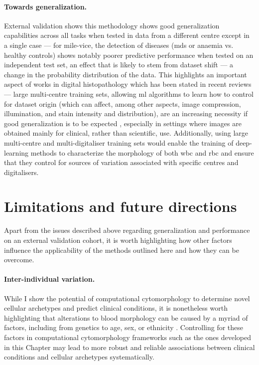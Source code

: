 \paragraph{Towards generalization.} External validation shows this methodology shows good generalization capabilities across all tasks when tested in data from a different centre except in a single case --- for \ac{mile-vice}, the detection of diseases (\ac{mds} or anaemia vs. healthy controls) shows notably poorer predictive performance when tested on an independent test set, an effect that is likely to stem from dataset shift --- a change in the probability distribution of the data. This highlights an important aspect of works in digital histopathology which has been stated in recent reviews --- large multi-centre training sets, allowing \ac{ml} algorithms to learn how to control for dataset origin (which can affect, among other aspects, image compression, illumination, and stain intensity and distribution), are an increasing necessity if good generalization is to be expected \cite{Van_der_Laak2021-id}, especially in settings where images are obtained mainly for clinical, rather than scientific, use. Additionally, using large multi-centre and multi-digitaliser training sets would enable the training of deep-learning methods to characterize the morphology of both \ac{wbc} and \ac{rbc} and ensure that they control for sources of variation associated with specific centres and digitalisers. 

\section{Limitations and future directions}

Apart from the issues described above regarding generalization and performance on an external validation cohort, it is worth highlighting how other factors influence the applicability of the methods outlined here and how they can be overcome.

\paragraph{Inter-individual variation.} While I show the potential of computational cytomorphology to determine novel cellular archetypes and predict clinical conditions, it is nonetheless worth highlighting that alterations to blood morphology can be caused by a myriad of factors, including from genetics to age, sex, or ethnicity \cite{Bain2014-oc,Hellstrom_Lindberg2015-zs,Lorey1996-yc}. Controlling for these factors in computational cytomorphology frameworks such as the ones developed in this Chapter may lead to more robust and reliable associations between clinical conditions and cellular archetypes systematically.

